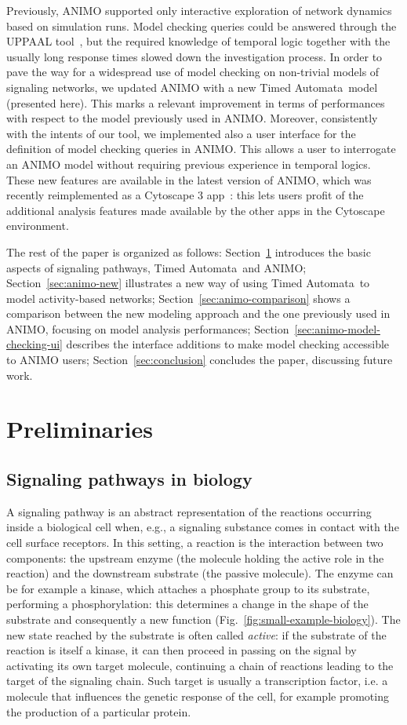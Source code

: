 \documentclass{llncs}
\newcommand{\tas}{Timed Automata}
\begin{document}
Previously, ANIMO supported only interactive exploration of network dynamics based on simulation runs. 
Model checking queries could be answered through the UPPAAL tool~\cite{uppaal}, but
the required knowledge of temporal logic together with the usually long response times slowed down the investigation process.
In order to pave the way for a widespread use of model checking on non-trivial models of
signaling networks, we updated ANIMO with a new \tas\ model (presented here). This marks a relevant improvement in terms of
performances with respect to the model previously used in ANIMO. Moreover, consistently with the intents of our tool, we
implemented also a user interface for the definition of model checking queries in ANIMO. This allows a
user to interrogate an ANIMO model without requiring previous experience in temporal logics. These new
features are available in the latest version of ANIMO, which was recently reimplemented as a Cytoscape 3 app~\cite{animo-app-site}:
this lets users profit of the additional analysis features made available by the other apps in the Cytoscape environment.

The rest of the paper is organized as follows: Section~\ref{sec:basics} introduces the basic aspects
of signaling pathways, \tas\ and ANIMO; Section~\ref{sec:animo-new} illustrates a new way of using \tas\ to model
activity-based networks;
Section~\ref{sec:animo-comparison} shows a comparison between the new modeling approach and the
one previously used in ANIMO,
focusing on model analysis performances; Section~\ref{sec:animo-model-checking-ui} describes the
interface additions to make model checking accessible to ANIMO users;
Section~\ref{sec:conclusion} concludes the paper, discussing future work.

\section{Preliminaries}\label{sec:basics}

\subsection{Signaling pathways in biology}\label{sec:biologia}
A signaling pathway is an abstract representation of the reactions occurring inside a biological cell when, e.g., a
signaling substance comes in contact with the cell surface receptors.
In this setting, a reaction is the interaction between
two components: the upstream enzyme (the molecule holding the active role in the reaction) and the downstream
substrate (the passive molecule). The enzyme can be for example a kinase, which attaches a phosphate group to its
substrate, performing a phosphorylation: this determines a change in the shape of the substrate
and consequently a new function (Fig.~\ref{fig:small-example-biology}).
The new state reached by the substrate
is often called \emph{active}: if the substrate of the reaction is itself a kinase, it can then proceed in passing
on the signal by activating its own target molecule, continuing a chain of reactions leading to the target
of the signaling chain. Such target is usually a transcription factor, i.e. a molecule that influences
the genetic response of the cell, for example promoting the production of a particular protein.
\end{document}
